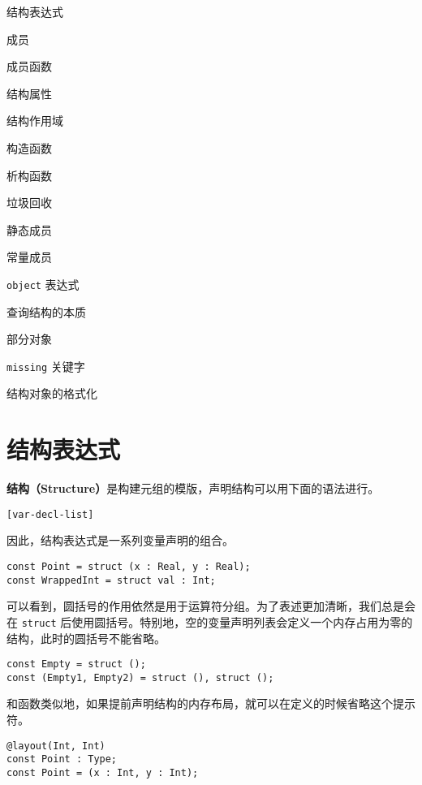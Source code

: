 \begin{introduction}
    \item 结构表达式
    \item 成员
    \item 成员函数
    \item 结构属性
    \item 结构作用域
    \item 构造函数
    \item 析构函数
    \item 垃圾回收
    \item 静态成员
    \item 常量成员
    \item \lstinline!object! 表达式
    \item 查询结构的本质
    \item 部分对象
    \item \lstinline!missing! 关键字
    \item 结构对象的格式化
\end{introduction}

\section{结构表达式}

\textbf{结构（Structure）}是构建元组的模版，声明结构可以用下面的语法进行。

\begin{grammar}[结构表达式] \label{grm:struct-expression}
    \lstinline![var-decl-list]!
\end{grammar}

因此，结构表达式是一系列变量声明的组合。

\begin{lstlisting}
const Point = struct (x : Real, y : Real);
const WrappedInt = struct val : Int;
\end{lstlisting}

可以看到，圆括号的作用依然是用于运算符分组。为了表述更加清晰，我们总是会在 \lstinline!struct! 后使用圆括号。特别地，空的变量声明列表会定义一个内存占用为零的结构，此时的圆括号不能省略。

\begin{lstlisting}
const Empty = struct ();
const (Empty1, Empty2) = struct (), struct ();
\end{lstlisting}

和函数类似地，如果提前声明结构的内存布局，就可以在定义的时候省略这个提示符。

\begin{lstlisting}
@layout(Int, Int)
const Point : Type;
const Point = (x : Int, y : Int);
\end{lstlisting}

